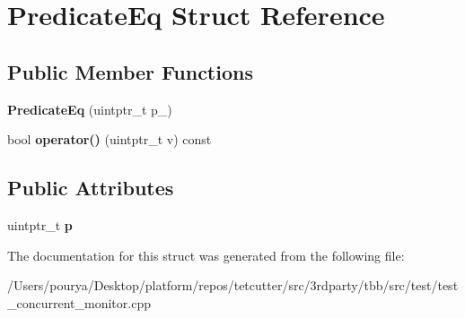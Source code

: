 \hypertarget{structPredicateEq}{}\section{Predicate\+Eq Struct Reference}
\label{structPredicateEq}
\subsection*{Public Member Functions}
\begin{DoxyCompactItemize}
\item 
\hypertarget{structPredicateEq_a0a11f0d1838c7cf68327bc0a77344d1d}{}{\bfseries Predicate\+Eq} (uintptr\+\_\+t p\+\_\+)\label{structPredicateEq_a0a11f0d1838c7cf68327bc0a77344d1d}

\item 
\hypertarget{structPredicateEq_a6a46f4a2632879092e10474f687a0eab}{}bool {\bfseries operator()} (uintptr\+\_\+t v) const \label{structPredicateEq_a6a46f4a2632879092e10474f687a0eab}

\end{DoxyCompactItemize}
\subsection*{Public Attributes}
\begin{DoxyCompactItemize}
\item 
\hypertarget{structPredicateEq_a1bb024aca25e8c29eda541ead961a2b7}{}uintptr\+\_\+t {\bfseries p}\label{structPredicateEq_a1bb024aca25e8c29eda541ead961a2b7}

\end{DoxyCompactItemize}


The documentation for this struct was generated from the following file\+:\begin{DoxyCompactItemize}
\item 
/\+Users/pourya/\+Desktop/platform/repos/tetcutter/src/3rdparty/tbb/src/test/test\+\_\+concurrent\+\_\+monitor.\+cpp\end{DoxyCompactItemize}
